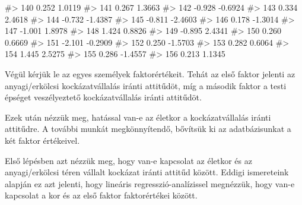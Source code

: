 \documentclass[
  letterpaper,
]{krantz}
\makeatletter
\newenvironment{Shaded}{\begin{snugshade}}{\end{snugshade}}
\newcommand{\CommentTok}[1]{\textcolor[rgb]{0.37,0.37,0.37}{#1}}
\newcommand{\FunctionTok}[1]{\textcolor[rgb]{0.28,0.35,0.67}{#1}}
\newcommand{\NormalTok}[1]{\textcolor[rgb]{0.00,0.23,0.31}{#1}}
\newcommand{\OtherTok}[1]{\textcolor[rgb]{0.00,0.23,0.31}{#1}}
\newcommand{\SpecialCharTok}[1]{\textcolor[rgb]{0.37,0.37,0.37}{#1}}
\newenvironment{kframe}{%
\medskip{}
\setlength{\fboxsep}{.8em}
 \def\at@end@of@kframe{}%
 \ifinner\ifhmode%
  \def\at@end@of@kframe{\end{minipage}}%
  \begin{minipage}{\columnwidth}%
 \fi\fi%
 \def\FrameCommand##1{\hskip\@totalleftmargin \hskip-\fboxsep
 \colorbox{shadecolor}{##1}\hskip-\fboxsep
     \hskip-\linewidth \hskip-\@totalleftmargin \hskip\columnwidth}%
 \MakeFramed {\advance\hsize-\width
   \@totalleftmargin\z@ \linewidth\hsize
   \@setminipage}}%
 {\par\unskip\endMakeFramed%
 \at@end@of@kframe}
\renewenvironment{Shaded}{\begin{kframe}}{\end{kframe}}
\makeatother
\begin{document}
\begin{Shaded}
\begin{Highlighting}[]
\CommentTok{\#\textgreater{} 140   0.252  1.0119}
\CommentTok{\#\textgreater{} 141   0.267  1.3663}
\CommentTok{\#\textgreater{} 142  {-}0.928 {-}0.6924}
\CommentTok{\#\textgreater{} 143   0.334  2.4618}
\CommentTok{\#\textgreater{} 144  {-}0.732 {-}1.4387}
\CommentTok{\#\textgreater{} 145  {-}0.811 {-}2.4603}
\CommentTok{\#\textgreater{} 146   0.178 {-}1.3014}
\CommentTok{\#\textgreater{} 147  {-}1.001  1.8978}
\CommentTok{\#\textgreater{} 148   1.424  0.8826}
\CommentTok{\#\textgreater{} 149  {-}0.895  2.4341}
\CommentTok{\#\textgreater{} 150   0.260  0.6669}
\CommentTok{\#\textgreater{} 151  {-}2.101 {-}0.2909}
\CommentTok{\#\textgreater{} 152   0.250 {-}1.5703}
\CommentTok{\#\textgreater{} 153   0.282  0.6064}
\CommentTok{\#\textgreater{} 154   1.445  2.5275}
\CommentTok{\#\textgreater{} 155   0.286 {-}1.4557}
\CommentTok{\#\textgreater{} 156   0.213  1.1345}
\end{Highlighting}
\end{Shaded}

Végül kérjük le az egyes személyek faktorértékeit. Tehát az első faktor
jelenti az anyagi/erkölcsi kockázatvállalás iránti attitűdöt, míg a
második faktor a testi épséget veszélyeztető kockázatvállalás iránti
attitűdöt.

Ezek után nézzük meg, hatással van-e az életkor a kockázatvállalás
iránti attitűdre. A további munkát megkönnyítendő, bővítsük ki az
adatbázisunkat a két faktor értékeivel.

\begin{Shaded}
\end{Shaded}

Első lépésben azt nézzük meg, hogy van-e kapcsolat az életkor és az
anyagi/erkölcsi téren vállalt kockázat iránti attitűd között. Eddigi
ismereteink alapján ez azt jelenti, hogy lineáris regresszió-analízissel
megnézzük, hogy van-e kapcsolat a kor és az első faktor faktorértékei
között.
\end{document}
